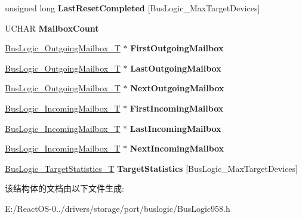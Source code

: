 \begin{DoxyCompactItemize}
\item 
\mbox{\label{struct_bus_logic___host_adapter_a480e1d6d2c40ff3c3d8e6e6a1b7dd4da}} 
unsigned long {\bfseries Last\+Reset\+Completed} \mbox{[}Bus\+Logic\+\_\+\+Max\+Target\+Devices\mbox{]}
\item 
\mbox{\label{struct_bus_logic___host_adapter_a44f1b61c6b6565a0ff41327f639ddb8b}} 
U\+C\+H\+AR {\bfseries Mailbox\+Count}
\item 
\mbox{\label{struct_bus_logic___host_adapter_a3d268183f93f9f109a18951e9ed89c47}} 
\hyperlink{struct_bus_logic___outgoing_mailbox}{Bus\+Logic\+\_\+\+Outgoing\+Mailbox\+\_\+T} $\ast$ {\bfseries First\+Outgoing\+Mailbox}
\item 
\mbox{\label{struct_bus_logic___host_adapter_a7fea8f933cd4593a5762ac878604cfae}} 
\hyperlink{struct_bus_logic___outgoing_mailbox}{Bus\+Logic\+\_\+\+Outgoing\+Mailbox\+\_\+T} $\ast$ {\bfseries Last\+Outgoing\+Mailbox}
\item 
\mbox{\label{struct_bus_logic___host_adapter_a470667163f8621695724dfdf77f97659}} 
\hyperlink{struct_bus_logic___outgoing_mailbox}{Bus\+Logic\+\_\+\+Outgoing\+Mailbox\+\_\+T} $\ast$ {\bfseries Next\+Outgoing\+Mailbox}
\item 
\mbox{\label{struct_bus_logic___host_adapter_a63eaec99b142857c72257d9a2f13bf08}} 
\hyperlink{struct_bus_logic___incoming_mailbox}{Bus\+Logic\+\_\+\+Incoming\+Mailbox\+\_\+T} $\ast$ {\bfseries First\+Incoming\+Mailbox}
\item 
\mbox{\label{struct_bus_logic___host_adapter_a5b3943190fe151e4da1131cda83062b5}} 
\hyperlink{struct_bus_logic___incoming_mailbox}{Bus\+Logic\+\_\+\+Incoming\+Mailbox\+\_\+T} $\ast$ {\bfseries Last\+Incoming\+Mailbox}
\item 
\mbox{\label{struct_bus_logic___host_adapter_a8af3cae60f96174e650d7cabe415f168}} 
\hyperlink{struct_bus_logic___incoming_mailbox}{Bus\+Logic\+\_\+\+Incoming\+Mailbox\+\_\+T} $\ast$ {\bfseries Next\+Incoming\+Mailbox}
\item 
\mbox{\label{struct_bus_logic___host_adapter_a6c804a6a775c5718c8679b7157cbbe66}} 
\hyperlink{struct_bus_logic___target_statistics}{Bus\+Logic\+\_\+\+Target\+Statistics\+\_\+T} {\bfseries Target\+Statistics} \mbox{[}Bus\+Logic\+\_\+\+Max\+Target\+Devices\mbox{]}
\end{DoxyCompactItemize}


该结构体的文档由以下文件生成\+:\begin{DoxyCompactItemize}
\item 
E\+:/\+React\+O\+S-\/0../drivers/storage/port/buslogic/Bus\+Logic958.\+h\end{DoxyCompactItemize}
